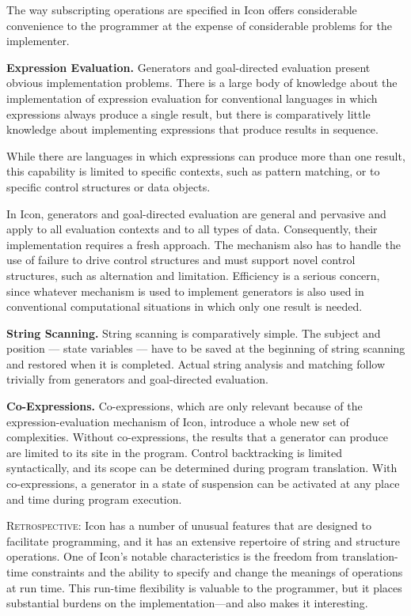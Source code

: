 The way subscripting operations are specified in Icon offers
considerable convenience to the programmer at the expense of
considerable problems for the implementer.


\textbf{Expression Evaluation.} Generators and goal-directed
evaluation present obvious implementation problems. There is a large
body of knowledge about the implementation of expression evaluation
for conventional languages in which expressions always produce a
single result, but there is comparatively little knowledge about
implementing expressions that produce results in sequence.

While there are languages in which expressions can produce more than
one result, this capability is limited to specific contexts, such as
pattern matching, or to specific control structures or data objects.

In Icon, generators and goal-directed evaluation are general and
pervasive and apply to all evaluation contexts and to all types of
data. Consequently, their implementation requires a fresh
approach. The mechanism also has to handle the use of failure to drive
control structures and must support novel control structures, such as
alternation and limitation. Efficiency is a serious concern, since
whatever mechanism is used to implement generators is also used in
conventional computational situations in which only one result is
needed.


\textbf{String Scanning.} String scanning is comparatively simple. The
subject and position --- {\textquotedbl}state variables{\textquotedbl}
--- have to be saved at the beginning of string scanning and restored
when it is completed.  Actual string analysis and matching follow
trivially from generators and goal-directed evaluation.


\textbf{Co-Expressions.} Co-expressions, which are only relevant
because of the expression-evaluation mechanism of Icon, introduce a
whole new set of complexities. Without co-expressions, the results
that a generator can produce are limited to its site in the
program. Control backtracking is limited syntactically, and its scope
can be determined during program translation. With co-expressions, a
generator in a state of suspension can be activated at any place and
time during program execution.


\textsc{Retrospective}: Icon has a number of unusual features that are
designed to facilitate programming, and it has an extensive repertoire
of string and structure operations. One of Icon's notable
characteristics is the freedom from translation-time constraints and
the ability to specify and change the meanings of operations at run
time. This run-time flexibility is valuable to the programmer, but it
places substantial burdens on the implementation{---}and also makes it
interesting.

